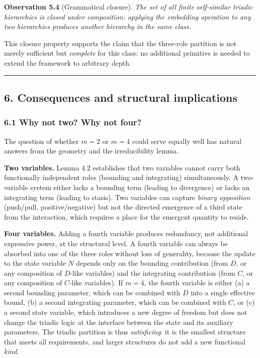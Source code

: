 \documentclass[
  11pt,
  letterpaper,
]{article}
\begin{document}
\textbf{Observation 5.4} (Grammatical closure). \emph{The set of all
finite self-similar triadic hierarchies is closed under composition:
applying the embedding operation to any two hierarchies produces another
hierarchy in the same class.}

This closure property supports the claim that the three-role partition
is not merely sufficient but \emph{complete} for this class: no
additional primitive is needed to extend the framework to arbitrary
depth.

\begin{center}\rule{0.5\linewidth}{0.5pt}\end{center}

\subsection{6. Consequences and structural
implications}\label{consequences-and-structural-implications}

\subsubsection{6.1 Why not two? Why not
four?}\label{why-not-two-why-not-four}

The question of whether \(m = 2\) or \(m = 4\) could serve equally well
has natural answers from the geometry and the irreducibility lemma.

\textbf{Two variables.} Lemma 4.2 establishes that two variables cannot
carry both functionally independent roles (bounding and integrating)
simultaneously. A two-variable system either lacks a bounding term
(leading to divergence) or lacks an integrating term (leading to
stasis). Two variables can capture \emph{binary opposition} (push/pull,
positive/negative) but not the directed emergence of a third state from
the interaction, which requires a place for the emergent quantity to
reside.

\textbf{Four variables.} Adding a fourth variable produces redundancy,
not additional expressive power, at the structural level. A fourth
variable can always be absorbed into one of the three roles without loss
of generality, because the update to the state variable \(N\) depends
only on the bounding contribution (from \(D\), or any composition of
\(D\)-like variables) and the integrating contribution (from \(C\), or
any composition of \(C\)-like variables). If \(m = 4\), the fourth
variable is either (a) a second bounding parameter, which can be
combined with \(D\) into a single effective bound, (b) a second
integrating parameter, which can be combined with \(C\), or (c) a second
state variable, which introduces a new degree of freedom but does not
change the triadic logic at the interface between the state and its
auxiliary parameters. The triadic partition is thus \emph{satisficing}:
it is the smallest structure that meets all requirements, and larger
structures do not add a new functional \emph{kind}.
\end{document}

